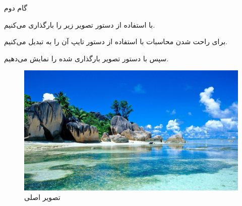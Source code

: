 \Problem
{گام دوم}
{
    با استفاده از دستور 
    تصویر زیر را بارگذاری می‌کنیم.
    
    برای راحت شدن محاسبات با استفاده از دستور 
    تایپ آن را به 
    تبدیل می‌کنیم.
    
    سپس با دستور 
    تصویر بارگذاری شده را نمایش می‌دهیم.
    
    \begin{figure}[H]
        \includegraphics[width=15cm]{Images/Original.jpg}
        \centering
        \caption{تصویر اصلی}
    \end{figure}
}
